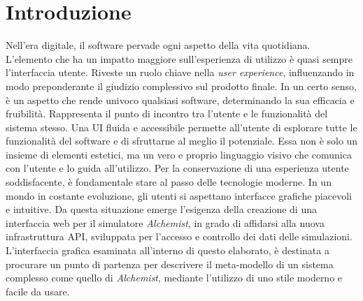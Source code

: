 \chapter{Introduzione}\label{chap:introduction}
Nell'era digitale, il software pervade ogni aspetto della vita quotidiana. L'elemento che ha un impatto maggiore sull'esperienza di utilizzo è quasi sempre l'interfaccia utente. Riveste un ruolo chiave nella \textit{user experience},  influenzando in modo preponderante il giudizio complessivo sul prodotto finale. In un certo senso, è un aspetto che rende univoco qualsiasi software, determinando la sua efficacia e fruibilità. Rappresenta il punto di incontro tra l'utente e le funzionalità del sistema stesso. Una \ac{UI} fluida e accessibile permette all'utente di esplorare tutte le funzionalità del software e di sfruttarne al meglio il potenziale. Essa non è solo un insieme di elementi estetici, ma un vero e proprio linguaggio visivo che comunica con l'utente e lo guida all'utilizzo.
\newline 
Per la conservazione di una esperienza utente soddisfacente, è fondamentale stare al passo delle tecnologie moderne. In un mondo in costante evoluzione, gli utenti si aspettano interfacce grafiche piacevoli e intuitive.
Da questa situazione emerge l'esigenza della creazione di una interfaccia web per il simulatore \textit{Alchemist}, in grado di affidarsi alla nuova infrastruttura \ac{API}, sviluppata per l'accesso e controllo dei dati delle simulazioni. L'interfaccia grafica esaminata all'interno di questo elaborato, è destinata a procurare un punto di partenza per descrivere il meta-modello di un sistema complesso come quello di \textit{Alchemist}, mediante l'utilizzo di uno stile moderno e facile da usare.
